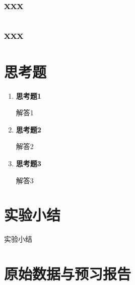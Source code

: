 \documentclass[10pt, a4paper]{article}
\begin{document}
\subsection{xxx}


\subsection{xxx}


\section{思考题}

\begin{enumerate}
    \item \textbf{思考题1}

    解答1

    \item \textbf{思考题2}

    解答2

    \item \textbf{思考题3}

    解答3
\end{enumerate}

\section{实验小结}

实验小结

\appendix
\addappheadtotoc

\section{原始数据与预习报告}
\end{document}
